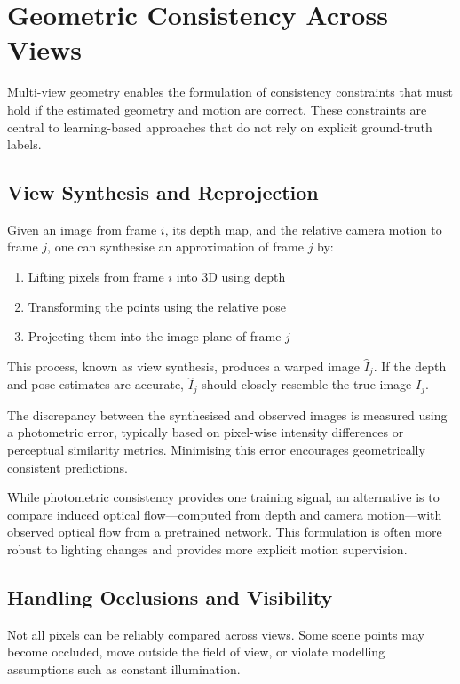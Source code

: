\section{Geometric Consistency Across Views}
Multi-view geometry enables the formulation of consistency constraints that must hold if the estimated geometry and motion are correct. These constraints are central to learning-based approaches that do not rely on explicit ground-truth labels.

\subsection{View Synthesis and Reprojection}
Given an image from frame $i$, its depth map, and the relative camera motion to frame $j$, one can synthesise an approximation of frame $j$ by:

\begin{enumerate}
    \item Lifting pixels from frame $i$ into 3D using depth
    \item Transforming the points using the relative pose
    \item Projecting them into the image plane of frame $j$
\end{enumerate}

This process, known as view synthesis, produces a warped image $\hat{I}_j$. If the depth and pose estimates are accurate, $\hat{I}_j$ should closely resemble the true image $I_j$.

The discrepancy between the synthesised and observed images is measured using a photometric error, typically based on pixel-wise intensity differences or perceptual similarity metrics. Minimising this error encourages geometrically consistent predictions.

While photometric consistency provides one training signal, an alternative is to compare induced optical flow---computed from depth and camera motion---with observed optical flow from a pretrained network. This formulation is often more robust to lighting changes and provides more explicit motion supervision.

\subsection{Handling Occlusions and Visibility}
Not all pixels can be reliably compared across views. Some scene points may become occluded, move outside the field of view, or violate modelling assumptions such as constant illumination.

